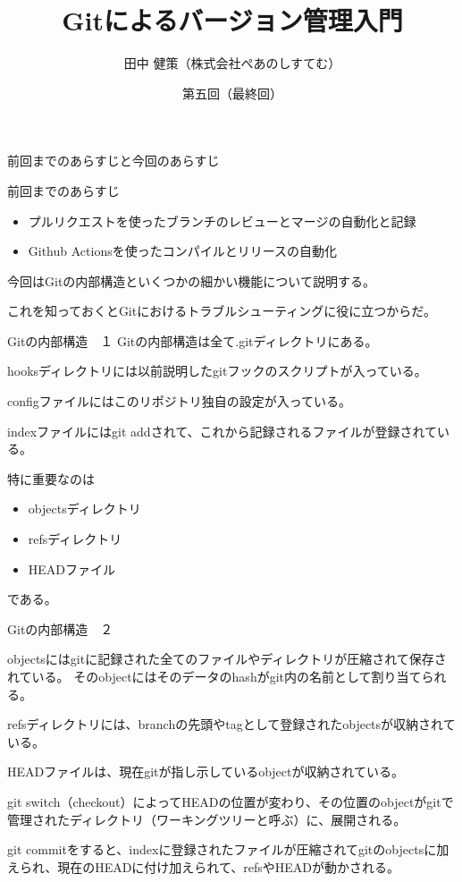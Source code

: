 \documentclass[12pt, unicode]{beamer}
\title{Gitによるバージョン管理入門}
\author{田中 健策（株式会社ぺあのしすてむ）}
\date[2019/10/30]{第五回（最終回）}
\begin{document}
\frame{\maketitle}

\begin{frame}{前回までのあらすじと今回のあらすじ}

前回までのあらすじ
\begin{itemize}
\item プルリクエストを使ったブランチのレビューとマージの自動化と記録
\item Github Actionsを使ったコンパイルとリリースの自動化
\end{itemize}

今回はGitの内部構造といくつかの細かい機能について説明する。

これを知っておくとGitにおけるトラブルシューティングに役に立つからだ。

\end{frame}
\begin{frame}{Gitの内部構造　１}
Gitの内部構造は全て.gitディレクトリにある。

hooksディレクトリには以前説明したgitフックのスクリプトが入っている。

configファイルにはこのリポジトリ独自の設定が入っている。

indexファイルにはgit addされて、これから記録されるファイルが登録されている。

特に重要なのは
\begin{itemize}
\item objectsディレクトリ
\item refsディレクトリ
\item HEADファイル
\end{itemize}
である。

\end{frame}
\begin{frame}{Gitの内部構造　２}

objectsにはgitに記録された全てのファイルやディレクトリが圧縮されて保存されている。
そのobjectにはそのデータのhashがgit内の名前として割り当てられる。

refsディレクトリには、branchの先頭やtagとして登録されたobjectsが収納されている。

HEADファイルは、現在gitが指し示しているobjectが収納されている。

git switch（checkout）によってHEADの位置が変わり、その位置のobjectがgitで管理されたディレクトリ（ワーキングツリーと呼ぶ）に、展開される。

git commitをすると、indexに登録されたファイルが圧縮されてgitのobjectsに加えられ、現在のHEADに付け加えられて、refsやHEADが動かされる。

\end{frame}
\end{document}
